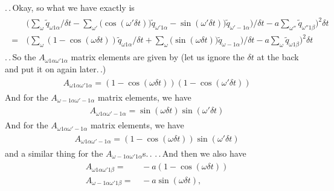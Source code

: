 \documentclass{report}
\begin{document}
.\,.\,Okay, so what we have exactly is
\begin{align}
\begin{aligned}
	&\,\bigg( 
		\sum_{\omega} 
			\tilde q_{\omega 1\alpha} 
			/ \delta t 
		- 
		\sum_{\omega'} \big(
			\cos(\omega' \delta t)) \tilde q_{\omega' 1\alpha} -
			\sin(\omega' \delta t)) \tilde q_{\omega'-1\alpha}
		\big) / \delta t 
		- 
		a \sum_{\omega''} 
			\tilde q_{\omega'' 1\beta}
	\bigg)^2 
	\delta t %
	\\
	=&\,\bigg( 
		\sum_{\omega} 
			(1 - \cos(\omega \delta t)) \tilde q_{\omega 1\alpha} 
			/ \delta t 
		+ 
		\sum_{\omega} \big(
			\sin(\omega \delta t)) \tilde q_{\omega-1\alpha}
		\big) / \delta t 
		- 
		a \sum_{\omega} 
			\tilde q_{\omega 1\beta}
	\bigg)^2 
	\delta t
\end{aligned}
\end{align}
.\,.\,So the %
$A_{\omega 1\alpha\omega' 1\alpha}$ matrix elements are given by (let us ignore the $\delta t$ at the back and put it on again later.\,.)
\begin{align}
\begin{aligned}
	A_{\omega 1\alpha\omega' 1\alpha} = 
		(1 - \cos(\omega \delta t)) (1 - \cos(\omega' \delta t))
\end{aligned}
\end{align}
And for the $A_{\omega-1\alpha\omega'-1\alpha}$ matrix elements, we have
\begin{align}
\begin{aligned}
	A_{\omega 1\alpha\omega'-1\alpha} = 
		\sin(\omega \delta t) \sin(\omega' \delta t)
\end{aligned}
\end{align}
And for the $A_{\omega 1\alpha\omega'-1\alpha}$ matrix elements, we have
\begin{align}
\begin{aligned}
	A_{\omega 1\alpha\omega'-1\alpha} = 
		(1 - \cos(\omega \delta t)) \sin(\omega' \delta t)
\end{aligned}
\end{align}
and a similar thing for the $A_{\omega-1\alpha\omega' 1\alpha}$s.\,. .\,.\,And then we also have 
\begin{align}
\begin{aligned}
	A_{\omega 1\alpha\omega' 1\beta} =&\, 
		-a (1 - \cos(\omega \delta t))\\
	A_{\omega-1\alpha\omega' 1\beta} =&\, 
		-a \sin(\omega \delta t),
\end{aligned}
\end{align}
\end{document}

